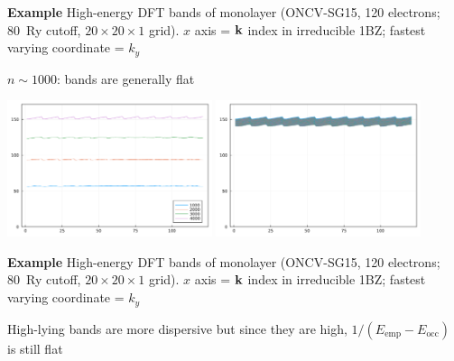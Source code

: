 \documentclass[t]{beamer}
\begin{document}
\begin{frame}[allowframebreaks]
\textbf{Example} High-energy DFT bands of  monolayer 
(ONCV-SG15, 120 electrons; \SI{80}{Ry} cutoff, $20 \times 20 \times 1$ grid). 
$x$ axis = $\vb{k}$ index in irreducible 1BZ; 
fastest varying coordinate = $k_y$ 

\vspace{0.5cm}

\faHandPointRight $n \sim 1000$: bands are generally flat 

\framebreak

\begin{center}
    \includegraphics[width=0.45\textwidth]{../data/energy/energies-different-blocks.png}
    \includegraphics[width=0.45\textwidth]{../data/energy/energies-same-blocks-4000.png}
\end{center}

\textbf{Example} High-energy DFT bands of  monolayer 
(ONCV-SG15, 120 electrons; \SI{80}{Ry} cutoff, $20 \times 20 \times 1$ grid). 
$x$ axis = $\vb{k}$ index in irreducible 1BZ; 
fastest varying coordinate = $k_y$ 

\vspace{0.5cm}

\faHandPointRight High-lying bands are more dispersive but since they are high, $1 / (E_{\text{emp}} - E_{\text{occ}})$ is still flat 


\end{frame}
\end{document}
